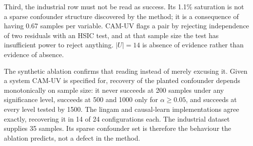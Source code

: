 Third, the industrial row must not be read as success. Its 1.1\% saturation is not a sparse confounder structure discovered by the method; it is a consequence of having 0.67 samples per variable. CAM-UV flags a pair by rejecting independence of two residuals with an HSIC test, and at that sample size the test has insufficient power to reject anything. $|U| = 14$ is absence of evidence rather than evidence of absence.

The synthetic ablation confirms that reading instead of merely excusing it. Given a system CAM-UV is specified for, recovery of the planted confounder depends monotonically on sample size: it never succeeds at 200 samples under any significance level, succeeds at 500 and 1000 only for $\alpha \geq 0.05$, and succeeds at every level tested by 1500. The lingam and causal-learn implementations agree exactly, recovering it in 14 of 24 configurations each. The industrial dataset supplies 35 samples. Its sparse confounder set is therefore the behaviour the ablation predicts, not a defect in the method.
